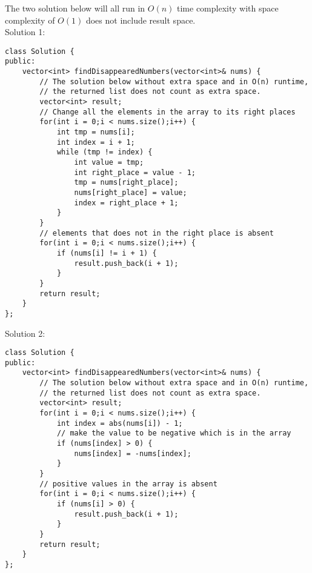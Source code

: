 \documentclass[12pt]{article}
\begin{document}
\begin{enumerate}
 The two solution below will all run in $O(n)$ time complexity with space complexity of $O(1)$ does not include result space. \\
 Solution 1:
\begin{verbatim}
class Solution {
public:
    vector<int> findDisappearedNumbers(vector<int>& nums) {
        // The solution below without extra space and in O(n) runtime, 
        // the returned list does not count as extra space.
        vector<int> result;
        // Change all the elements in the array to its right places
        for(int i = 0;i < nums.size();i++) {
            int tmp = nums[i];
            int index = i + 1;
            while (tmp != index) {
                int value = tmp;
                int right_place = value - 1;
                tmp = nums[right_place];
                nums[right_place] = value;   
                index = right_place + 1;
            }
        }
        // elements that does not in the right place is absent
        for(int i = 0;i < nums.size();i++) {
            if (nums[i] != i + 1) {
                result.push_back(i + 1);
            }
        }
        return result;
    }
};
\end{verbatim}
Solution 2:
\begin{verbatim}
class Solution {
public:
    vector<int> findDisappearedNumbers(vector<int>& nums) {
        // The solution below without extra space and in O(n) runtime, 
        // the returned list does not count as extra space.
        vector<int> result;
        for(int i = 0;i < nums.size();i++) {
            int index = abs(nums[i]) - 1;
            // make the value to be negative which is in the array 
            if (nums[index] > 0) {
                nums[index] = -nums[index]; 
            }
        }
        // positive values in the array is absent
        for(int i = 0;i < nums.size();i++) {
            if (nums[i] > 0) {
                result.push_back(i + 1);
            }
        }  
        return result;
    }
};
\end{verbatim}
	
\end{enumerate}
\end{document}
